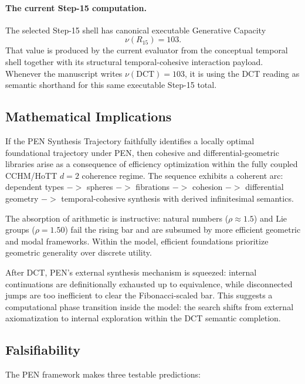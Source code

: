 \documentclass[11pt,a4paper]{article}
\def\to{->}%
\theoremstyle{plain}
\theoremstyle{definition}
\theoremstyle{remark}
\begin{document}
\paragraph{The current Step-15 computation.}
The selected Step-15 shell has canonical executable Generative Capacity
\[
  \nu(R_{15}) = 103.
\]
That value is produced by the current evaluator from the conceptual temporal shell together with its structural temporal-cohesive interaction payload.
Whenever the manuscript writes $\nu(\mathrm{DCT})=103$, it is using the DCT reading as semantic shorthand for this same executable Step-15 total.

\subsection{Mathematical Implications}

If the PEN Synthesis Trajectory faithfully identifies a locally optimal foundational trajectory under PEN, then cohesive and differential-geometric libraries arise as a consequence of efficiency optimization within the fully coupled CCHM/HoTT $d = 2$ coherence regime.
The sequence exhibits a coherent arc: dependent types $\to$ spheres $\to$ fibrations $\to$ cohesion $\to$ differential geometry $\to$ temporal-cohesive synthesis with derived infinitesimal semantics.

The absorption of arithmetic is instructive: natural numbers ($\rho \approx 1.5$) and Lie groups ($\rho = 1.50$) fail the rising bar and are subsumed by more efficient geometric and modal frameworks.
Within the model, efficient foundations prioritize geometric generality over discrete utility.

After DCT, PEN's external synthesis mechanism is squeezed: internal continuations are definitionally exhausted up to equivalence, while disconnected jumps are too inefficient to clear the Fibonacci-scaled bar.
This suggests a computational phase transition inside the model: the search shifts from external axiomatization to internal exploration within the DCT semantic completion.

\subsection{Falsifiability}

The PEN framework makes three testable predictions:
\end{document}
